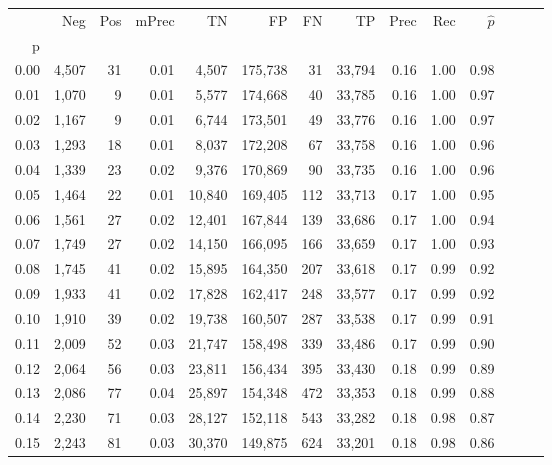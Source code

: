 \begin{tabular}{rrrrrrrrrrrrrr}
\toprule
{} &    Neg &    Pos & mPrec &       TN &       FP &      FN &      TP &  Prec &   Rec & $\hat{p}$ \\
p    &        &        &       &          &          &         &         &       &       &           \\
\midrule
0.00 &  4,507 &     31 &  0.01 &    4,507 &  175,738 &      31 &  33,794 &  0.16 &  1.00 &      0.98 \\
0.01 &  1,070 &      9 &  0.01 &    5,577 &  174,668 &      40 &  33,785 &  0.16 &  1.00 &      0.97 \\
0.02 &  1,167 &      9 &  0.01 &    6,744 &  173,501 &      49 &  33,776 &  0.16 &  1.00 &      0.97 \\
0.03 &  1,293 &     18 &  0.01 &    8,037 &  172,208 &      67 &  33,758 &  0.16 &  1.00 &      0.96 \\
0.04 &  1,339 &     23 &  0.02 &    9,376 &  170,869 &      90 &  33,735 &  0.16 &  1.00 &      0.96 \\
0.05 &  1,464 &     22 &  0.01 &   10,840 &  169,405 &     112 &  33,713 &  0.17 &  1.00 &      0.95 \\
0.06 &  1,561 &     27 &  0.02 &   12,401 &  167,844 &     139 &  33,686 &  0.17 &  1.00 &      0.94 \\
0.07 &  1,749 &     27 &  0.02 &   14,150 &  166,095 &     166 &  33,659 &  0.17 &  1.00 &      0.93 \\
0.08 &  1,745 &     41 &  0.02 &   15,895 &  164,350 &     207 &  33,618 &  0.17 &  0.99 &      0.92 \\
0.09 &  1,933 &     41 &  0.02 &   17,828 &  162,417 &     248 &  33,577 &  0.17 &  0.99 &      0.92 \\
0.10 &  1,910 &     39 &  0.02 &   19,738 &  160,507 &     287 &  33,538 &  0.17 &  0.99 &      0.91 \\
0.11 &  2,009 &     52 &  0.03 &   21,747 &  158,498 &     339 &  33,486 &  0.17 &  0.99 &      0.90 \\
0.12 &  2,064 &     56 &  0.03 &   23,811 &  156,434 &     395 &  33,430 &  0.18 &  0.99 &      0.89 \\
0.13 &  2,086 &     77 &  0.04 &   25,897 &  154,348 &     472 &  33,353 &  0.18 &  0.99 &      0.88 \\
0.14 &  2,230 &     71 &  0.03 &   28,127 &  152,118 &     543 &  33,282 &  0.18 &  0.98 &      0.87 \\
0.15 &  2,243 &     81 &  0.03 &   30,370 &  149,875 &     624 &  33,201 &  0.18 &  0.98 &      0.86 \\

\end{tabular}

